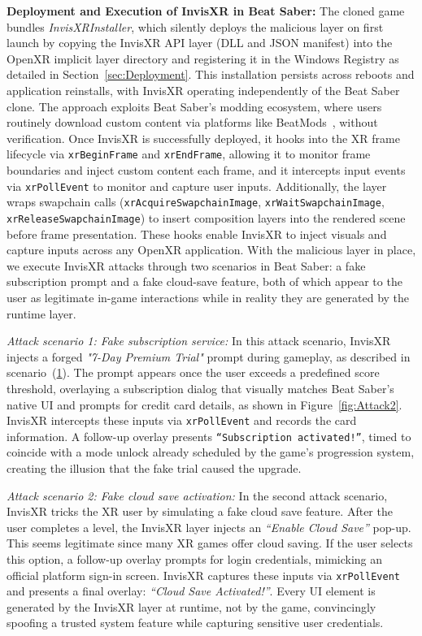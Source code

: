 \documentclass[letterpaper,twocolumn,10pt]{article}
\begin{document}
\textbf{Deployment and Execution of InvisXR in Beat Saber:} The cloned game bundles \textit{InvisXRInstaller}, which silently deploys the malicious layer on first launch by copying the InvisXR API layer (DLL and JSON manifest) into the OpenXR implicit layer directory and registering it in the Windows Registry as detailed in Section~\ref{sec:Deployment}. This installation persists across reboots and application reinstalls, with InvisXR operating independently of the Beat Saber clone. The approach exploits Beat Saber's modding ecosystem, where users routinely download custom content via platforms like BeatMods~\cite{BeatMods}, without verification. Once InvisXR is successfully deployed, it hooks into the XR frame lifecycle via \texttt{xrBeginFrame} and \texttt{xrEndFrame}, allowing it to monitor frame boundaries and inject custom content each frame, and it intercepts input events via \texttt{xrPollEvent} to monitor and capture user inputs. Additionally, the layer wraps swapchain calls (\texttt{xrAcquireSwapchainImage}, \texttt{xrWaitSwapchainImage}, \texttt{xrReleaseSwapchainImage}) to insert composition layers into the rendered scene before frame presentation. These hooks enable InvisXR to inject visuals and capture inputs across any OpenXR application. With the malicious layer in place, we execute InvisXR attacks through two scenarios in Beat Saber: a fake subscription prompt and a fake cloud-save feature, both of which appear to the user as legitimate in-game interactions while in reality they are generated by the runtime layer.

\textit{Attack scenario 1: Fake subscription service:} In this attack scenario, InvisXR injects a forged \textit{"7-Day Premium Trial"} prompt during gameplay, as described in scenario~(\hyperlink{scenario 1}{1}). The prompt appears once the user exceeds a predefined score threshold, overlaying a subscription dialog that visually matches Beat Saber's native UI and prompts for credit card details, as shown in Figure~\ref{fig:Attack2}. InvisXR intercepts these inputs via \texttt{xrPollEvent} and records the card information. A follow-up overlay presents \texttt{``Subscription activated!''}, timed to coincide with a mode unlock already scheduled by the game's progression system, creating the illusion that the fake trial caused the upgrade.

\textit{Attack scenario 2: Fake cloud save activation:} In the second attack scenario, InvisXR tricks the XR user by simulating a fake cloud save feature. After the user completes a level, the InvisXR layer injects an \textit{``Enable Cloud Save”} pop-up. This seems legitimate since many XR games offer cloud saving. If the user selects this option, a follow-up overlay prompts for login credentials, mimicking an official platform sign-in screen. InvisXR captures these inputs via \texttt{xrPollEvent} and presents a final overlay: \textit{``Cloud Save Activated!''}. Every UI element is generated by the InvisXR layer at runtime, not by the game, convincingly spoofing a trusted system feature while capturing sensitive user credentials.
\end{document}
